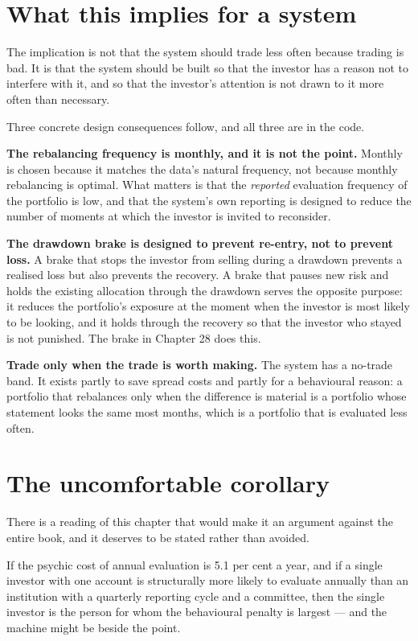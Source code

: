 \section{What this implies for a system}

The implication is not that the system should trade less often because
trading is bad. It is that the system should be built so that the investor
has a reason not to interfere with it, and so that the investor's attention
is not drawn to it more often than necessary.

Three concrete design consequences follow, and all three are in the code.

\textbf{The rebalancing frequency is monthly, and it is not the point.}
Monthly is chosen because it matches the data's natural frequency, not
because monthly rebalancing is optimal. What matters is that the
\emph{reported} evaluation frequency of the portfolio is low, and that the
system's own reporting is designed to reduce the number of moments at
which the investor is invited to reconsider.

\textbf{The drawdown brake is designed to prevent re-entry, not to prevent
loss.} A brake that stops the investor from selling during a drawdown
prevents a realised loss but also prevents the recovery. A brake that
pauses new risk and holds the existing allocation through the drawdown
serves the opposite purpose: it reduces the portfolio's exposure at the
moment when the investor is most likely to be looking, and it holds
through the recovery so that the investor who stayed is not punished. The
brake in Chapter 28 does this.

\textbf{Trade only when the trade is worth making.} The system has a
no-trade band. It exists partly to save spread costs and partly for a
behavioural reason: a portfolio that rebalances only when the difference
is material is a portfolio whose statement looks the same most months,
which is a portfolio that is evaluated less often.

\section{The uncomfortable corollary}

There is a reading of this chapter that would make it an argument against
the entire book, and it deserves to be stated rather than avoided.

If the psychic cost of annual evaluation is 5.1 per cent a year, and if a
single investor with one account is structurally more likely to evaluate
annually than an institution with a quarterly reporting cycle and a
committee, then the single investor is the person for whom the behavioural
penalty is largest --- and the machine might be beside the point.

